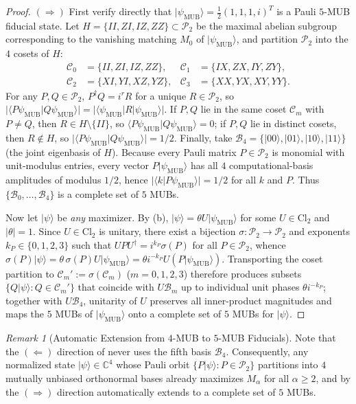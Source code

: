 \documentclass[11pt,a4paper]{article}
\theoremstyle{plain}
\theoremstyle{definition}
\theoremstyle{remark}
\newtheorem{remark}[theorem]{Remark}
\newcommand{\C}{\mathbb{C}}
\newcommand{\ket}[1]{\lvert #1 \rangle}
\newcommand{\braket}[2]{\langle #1 \vert #2 \rangle}
\newcommand{\expval}[2]{\langle #1 \vert #2 \vert #1 \rangle}
\newcommand{\Cl}{\mathrm{Cl}}
\newcommand{\Pauli}{\mathcal{P}}
\newcommand{\psimub}{\ket{\psi_{\mathrm{MUB}}}}
\begin{document}
\begin{proof}
$(\Rightarrow)$ First verify directly that $\psimub = \frac{1}{2}(1,1,1,i)^T$ is a Pauli $5$-MUB fiducial state. Let $H = \{II, ZI, IZ, ZZ\} \subset \Pauli_2$ be the maximal abelian subgroup corresponding to the vanishing matching $M_0$ of $\psimub$, and partition $\Pauli_2$ into the $4$ cosets of $H$:
\begin{align*}
  \mathcal{C}_0 &= \{II, ZI, IZ, ZZ\}, &
  \mathcal{C}_1 &= \{IX, ZX, IY, ZY\}, \\
  \mathcal{C}_2 &= \{XI, YI, XZ, YZ\}, &
  \mathcal{C}_3 &= \{XX, YX, XY, YY\}.
\end{align*}
For any $P, Q \in \Pauli_2$, $P^\dagger Q = i^r R$ for a unique $R \in \Pauli_2$, so $\lvert\braket{P\psi_{\mathrm{MUB}}}{Q\psi_{\mathrm{MUB}}}\rvert = \lvert\expval{\psi_{\mathrm{MUB}}}{R}\rvert$. If $P, Q$ lie in the same coset $\mathcal{C}_m$ with $P \neq Q$, then $R \in H \setminus \{II\}$, so $\braket{P\psi_{\mathrm{MUB}}}{Q\psi_{\mathrm{MUB}}} = 0$; if $P, Q$ lie in distinct cosets, then $R \notin H$, so $\lvert\braket{P\psi_{\mathrm{MUB}}}{Q\psi_{\mathrm{MUB}}}\rvert = 1/2$. Finally, take $\mathcal{B}_4 = \{\ket{00}, \ket{01}, \ket{10}, \ket{11}\}$ (the joint eigenbasis of $H$). Because every Pauli matrix $P \in \Pauli_2$ is monomial with unit-modulus entries, every vector $P\psimub$ has all $4$ computational-basis amplitudes of modulus $1/2$, hence $\lvert\braket{k}{P\psi_{\mathrm{MUB}}}\rvert = 1/2$ for all $k$ and $P$. Thus $\{\mathcal{B}_0, \dots, \mathcal{B}_4\}$ is a complete set of $5$ MUBs.

Now let $\ket{\psi}$ be \emph{any} maximizer. By (b), $\ket{\psi} = \theta U \psimub$ for some $U \in \Cl_2$ and $\lvert\theta\rvert = 1$. Since $U \in \Cl_2$ is unitary, there exist a bijection $\sigma : \Pauli_2 \to \Pauli_2$ and exponents $k_P \in \{0,1,2,3\}$ such that $U P U^\dagger = i^{k_P}\sigma(P)$ for all $P \in \Pauli_2$, whence $\sigma(P)\ket{\psi} = \theta\,\sigma(P) U \psimub = \theta i^{-k_P} U(P\psimub)$. Transporting the coset partition to $\mathcal{C}_m' := \sigma(\mathcal{C}_m)$ ($m = 0,1,2,3$) therefore produces subsets $\{Q\ket{\psi} : Q \in \mathcal{C}_m'\}$ that coincide with $U\mathcal{B}_m$ up to individual unit phases $\theta i^{-k_P}$; together with $U\mathcal{B}_4$, unitarity of $U$ preserves all inner-product magnitudes and maps the $5$ MUBs of $\psimub$ onto a complete set of $5$ MUBs for $\ket{\psi}$.
\end{proof}

\begin{remark}[Automatic Extension from $4$-MUB to $5$-MUB Fiducials]
Note that the $(\Leftarrow)$ direction of  never uses the fifth basis $\mathcal{B}_4$. Consequently, any normalized state $\ket{\psi} \in \C^4$ whose Pauli orbit $\{P\ket{\psi} : P \in \Pauli_2\}$ partitions into $4$ mutually unbiased orthonormal bases already maximizes $M_\alpha$ for all $\alpha \ge 2$, and by the $(\Rightarrow)$ direction automatically extends to a complete set of $5$ MUBs.
\end{remark}
\end{document}

